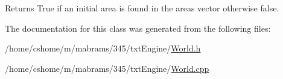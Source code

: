 \begin{DoxyReturn}{\-Returns}
\-True if an initial area is found in the areas vector otherwise false. 
\end{DoxyReturn}


\-The documentation for this class was generated from the following files\-:\begin{DoxyCompactItemize}
\item 
/home/cshome/m/mabrams/345/txt\-Engine/\hyperlink{_world_8h}{\-World.\-h}\item 
/home/cshome/m/mabrams/345/txt\-Engine/\hyperlink{_world_8cpp}{\-World.\-cpp}\end{DoxyCompactItemize}
